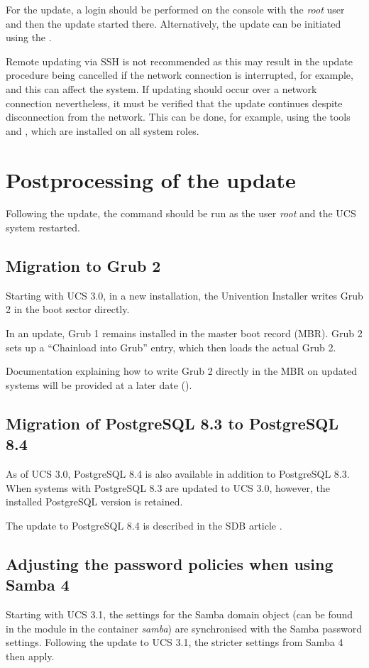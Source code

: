 For the update, a login should be performed on the console with
the \emph{root} user and then the update started there. Alternatively,
the update can be initiated using the \ucsUMC{}.

Remote updating via SSH is not recommended as this may result in the
update procedure being cancelled if the network connection is
interrupted, for example, and this can affect the system. If updating
should occur over a network connection nevertheless, it must be
verified that the update continues despite disconnection from the
network. This can be done, for example, using the
tools  and , which are installed on
all system roles.



\chapter{Postprocessing of the update}
Following the update, the command  
should be run as the user \emph{root} and the UCS system restarted.


\section{Migration to Grub 2}
Starting with UCS 3.0, in a new installation, the Univention Installer writes Grub 2 in the
boot sector directly.

In an update, Grub 1 remains installed in the master boot record
(MBR). Grub 2 sets up a ``Chainload into Grub'' entry, which then
loads the actual Grub 2.

Documentation explaining how to write Grub 2 directly in the MBR on
updated systems will be provided at a later date ().

\section{Migration of PostgreSQL 8.3 to PostgreSQL 8.4}
As of UCS 3.0, PostgreSQL 8.4 is also available in addition to
PostgreSQL 8.3. When systems with PostgreSQL 8.3 are updated to UCS
3.0, however, the installed PostgreSQL version is retained.

The update to PostgreSQL 8.4 is described in the SDB
article .

\section{Adjusting the password policies when using Samba 4}
Starting with UCS 3.1, the settings for the Samba domain object (can
be found in the \ucsUMC{} module  in the
container \emph{samba}) are synchronised with the Samba password
settings. Following the update to UCS 3.1, the stricter settings from
Samba 4 then apply.

